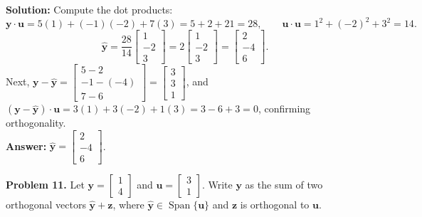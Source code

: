 \documentclass[11pt, letterpaper]{article}
\theoremstyle{definition}
\theoremstyle{remark}
\begin{document}
\textbf{Solution:} Compute the dot products:
\[
\mathbf{y} \cdot \mathbf{u} = 5(1) + (-1)(-2) + 7(3) = 5 + 2 + 21 = 28, \qquad
\mathbf{u} \cdot \mathbf{u} = 1^2 + (-2)^2 + 3^2 = 14.
\]
\[
\hat{\mathbf{y}} = \frac{28}{14}\begin{bmatrix} 1 \\ -2 \\ 3 \end{bmatrix} = 2\begin{bmatrix} 1 \\ -2 \\ 3 \end{bmatrix} = \begin{bmatrix} 2 \\ -4 \\ 6 \end{bmatrix}.
\]
Next, $\mathbf{y} - \hat{\mathbf{y}} = \begin{bmatrix} 5 - 2 \\ -1 - (-4) \\ 7 - 6 \end{bmatrix} = \begin{bmatrix} 3 \\ 3 \\ 1 \end{bmatrix}$, and $(\mathbf{y} - \hat{\mathbf{y}}) \cdot \mathbf{u} = 3(1) + 3(-2) + 1(3) = 3 - 6 + 3 = 0$, confirming orthogonality. \\
\textbf{Answer:} $\hat{\mathbf{y}} = \begin{bmatrix} 2 \\ -4 \\ 6 \end{bmatrix}$.

\textbf{Problem 11.} Let $\mathbf{y} = \begin{bmatrix} 1 \\ 4 \end{bmatrix}$ and $\mathbf{u} = \begin{bmatrix} 3 \\ 1 \end{bmatrix}$. Write $\mathbf{y}$ as the sum of two orthogonal vectors $\hat{\mathbf{y}} + \mathbf{z}$, where $\hat{\mathbf{y}} \in \operatorname{Span}\{\mathbf{u}\}$ and $\mathbf{z}$ is orthogonal to $\mathbf{u}$.
\end{document}
